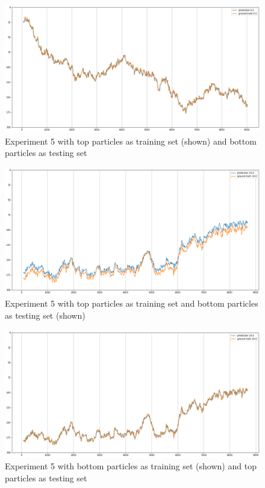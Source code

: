 \documentclass[a4paper]{article}
\begin{document}
\begin{figure}[h]
  \centering
  \includegraphics[width=\textwidth]{exp 5 train top}
  \caption{Experiment 5 with top particles as training set (shown) and bottom particles as testing set}
\end{figure}

\begin{figure}[h]
  \centering
  \includegraphics[width=\textwidth]{exp 5 test bot}
  \caption{Experiment 5 with top particles as training set and bottom particles as testing set (shown)}
\end{figure}

\begin{figure}[h]
  \centering
  \includegraphics[width=\textwidth]{exp 5 train bot}
  \caption{Experiment 5 with bottom particles as training set (shown) and top particles as testing set}
\end{figure}
\end{document}
